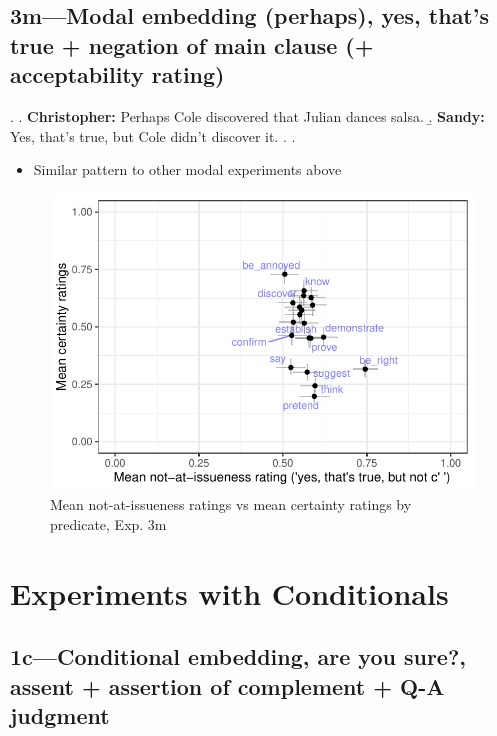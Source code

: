 \documentclass[11pt]{article}
\begin{document}

	\pagebreak
	\subsection{3m---Modal embedding (perhaps), yes, that's true + negation of main clause (+ acceptability rating)} %
		\ex. \a. \textbf{Christopher:} Perhaps Cole discovered that Julian dances salsa.
			\b. \textbf{Sandy:} Yes, that’s true, but Cole didn't discover it.
			\z.
		\z.

		\begin{itemize}
			\item Similar pattern to other modal experiments above
		\end{itemize}

		\begin{figure}[h]
			\centering
			\includegraphics[]{figures/m3-correl.pdf}
			\caption{Mean not-at-issueness ratings vs mean certainty ratings by predicate, Exp. 3m}
			\label{fig:m3-corr}
		\end{figure}
	
	
\pagebreak
\section{Experiments with Conditionals} %
	\subsection{1c---Conditional embedding,  are you sure?, assent + assertion of complement + Q-A judgment} 
\end{document}
